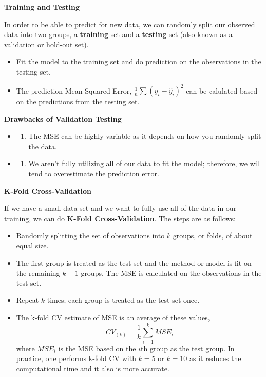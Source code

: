 \documentclass[
]{book}
\providecommand{\tightlist}{%
  \setlength{\itemsep}{0pt}\setlength{\parskip}{0pt}}
\begin{document}
\textbf{Training and Testing}

In order to be able to predict for new data, we can randomly split our observed data into two groups, a \textbf{training} set and a \textbf{testing} set (also known as a validation or hold-out set).

\begin{itemize}
\tightlist
\item
  Fit the model to the training set and do prediction on the observations in the testing set.
\item
  The prediction Mean Squared Error, \(\frac{1}{n}\sum(y_i - \hat{y}_i)^2\) can be calulated based on the predictions from the testing set.
\end{itemize}

\textbf{Drawbacks of Validation Testing}

\begin{itemize}
\item
  \begin{enumerate}
  \def\labelenumi{\arabic{enumi})}
  \tightlist
  \item
    The MSE can be highly variable as it depends on how you randomly split the data.
  \end{enumerate}
\item
  \begin{enumerate}
  \def\labelenumi{\arabic{enumi})}
  \setcounter{enumi}{1}
  \tightlist
  \item
    We aren't fully utilizing all of our data to fit the model; therefore, we will tend to overestimate the prediction error.
  \end{enumerate}
\end{itemize}

\textbf{K-Fold Cross-Validation}

If we have a small data set and we want to fully use all of the data in our training, we can do \textbf{K-Fold Cross-Validation}. The steps are as follows:

\begin{itemize}
\item
  Randomly splitting the set of observations into \(k\) groups, or folds, of about equal size.
\item
  The first group is treated as the test set and the method or model is fit on the remaining \(k-1\) groups. The MSE is calculated on the observations in the test set.
\item
  Repeat \(k\) times; each group is treated as the test set once.
\item
  The k-fold CV estimate of MSE is an average of these values,
  \[CV_{(k)} = \frac{1}{k}\sum^k_{i=1}MSE_i \]
  where \(MSE_i\) is the MSE based on the \(i\)th group as the test group. In practice, one performs k-fold CV with \(k=5\) or \(k=10\) as it reduces the computational time and it also is more accurate.
\end{itemize}
\end{document}
